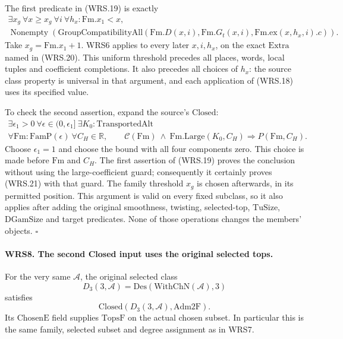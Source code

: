 The first predicate in (WRS.19) is exactly
\[
 \begin{gathered}
 \exists x_g\ \forall x\ge x_g\ \forall i\ \forall h_x:
          \mathrm{Fm}.x_1<x,\\
 \operatorname{Nonempty}\!\left(
 \mathrm{GroupCompatibilityAll}
       (\mathrm{Fm}.D(x,i),\mathrm{Fm}.G_t(x,i),
                       \mathrm{Fm}.\mathrm{ex}(x,h_x,i).c)\right).
 \end{gathered}
 \tag{WRS.20}
\]
Take \(x_g=\mathrm{Fm}.x_1+1\).  WRS6 applies to every later
\(x,i,h_x\), on the exact \(\mathrm{Extra}\) named in (WRS.20).
This uniform threshold precedes all places, words, local tuples
and coefficient completions.  It also precedes all choices of
\(h_x\): the source class property is universal in that argument,
and each application of (WRS.18) uses its specified value.

To check the second assertion, expand the source's \(\mathrm{Closed}\):
\[
 \begin{gathered}
 \exists\epsilon_1>0\ \forall\epsilon\in(0,\epsilon_1]\
 \exists K_0:\mathrm{TransportedAlt}\\
 \forall\mathrm{Fm}:\mathrm{FamP}(\epsilon)\ \forall C_H\in\mathbb R,
 \qquad \mathcal C(\mathrm{Fm})\ \land\
       \mathrm{Fm.Large}(K_0,C_H)\Longrightarrow P(\mathrm{Fm},C_H).
 \end{gathered}
 \tag{WRS.21}
\]
Choose \(\epsilon_1=1\) and choose the bound with all four
components zero.  This choice is made before \(\mathrm{Fm}\)
and \(C_H\).  The first assertion of (WRS.19) proves the
conclusion without using the large-coefficient guard; consequently
it certainly proves (WRS.21) with that guard.  The family threshold
\(x_g\) is chosen afterwards, in its permitted position.
This argument is valid on every fixed subclass, so it also applies
after adding the original smoothness, twisting, selected-top,
\(\mathrm{TuSize}\), \(\mathrm{DGamSize}\) and target predicates.
None of those operations changes the members' objects.
\hfill\(\square\)

\paragraph{WRS8. The second Closed input uses the original selected tops.}
\label{claim:WRS8}
For the very same \(\mathcal A\), the original selected class
\[
 D_3(3,\mathcal A)=\mathrm{Des}(\mathrm{WithChN}(\mathcal A),3)
 \tag{WRS.22}
\]
satisfies
\[
       \mathrm{Closed}(D_3(3,\mathcal A),\mathrm{Adm2F}).
 \tag{WRS.23}
\]
Its \(\mathrm{ChosenE}\) field supplies \(\mathrm{TopsF}\)
on the actual chosen subset.  In particular this is the same
family, selected subset and degree assignment as in WRS7.

